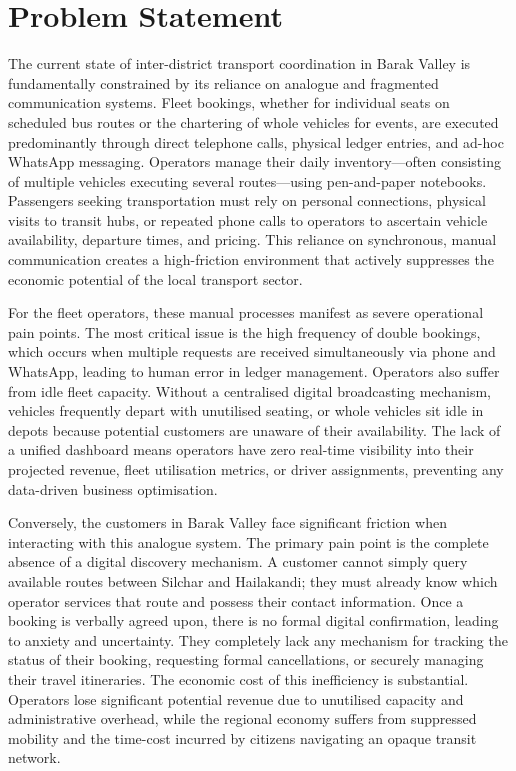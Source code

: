 \documentclass[12pt,a4paper]{report}
\begin{document}
\chapter{Problem Statement}

The current state of inter-district transport coordination in Barak Valley is fundamentally constrained by its reliance on analogue and fragmented communication systems. Fleet bookings, whether for individual seats on scheduled bus routes or the chartering of whole vehicles for events, are executed predominantly through direct telephone calls, physical ledger entries, and ad-hoc WhatsApp messaging. Operators manage their daily inventory---often consisting of multiple vehicles executing several routes---using pen-and-paper notebooks. Passengers seeking transportation must rely on personal connections, physical visits to transit hubs, or repeated phone calls to operators to ascertain vehicle availability, departure times, and pricing. This reliance on synchronous, manual communication creates a high-friction environment that actively suppresses the economic potential of the local transport sector.

For the fleet operators, these manual processes manifest as severe operational pain points. The most critical issue is the high frequency of double bookings, which occurs when multiple requests are received simultaneously via phone and WhatsApp, leading to human error in ledger management. Operators also suffer from idle fleet capacity. Without a centralised digital broadcasting mechanism, vehicles frequently depart with unutilised seating, or whole vehicles sit idle in depots because potential customers are unaware of their availability. The lack of a unified dashboard means operators have zero real-time visibility into their projected revenue, fleet utilisation metrics, or driver assignments, preventing any data-driven business optimisation.

Conversely, the customers in Barak Valley face significant friction when interacting with this analogue system. The primary pain point is the complete absence of a digital discovery mechanism. A customer cannot simply query available routes between Silchar and Hailakandi; they must already know which operator services that route and possess their contact information. Once a booking is verbally agreed upon, there is no formal digital confirmation, leading to anxiety and uncertainty. They completely lack any mechanism for tracking the status of their booking, requesting formal cancellations, or securely managing their travel itineraries. The economic cost of this inefficiency is substantial. Operators lose significant potential revenue due to unutilised capacity and administrative overhead, while the regional economy suffers from suppressed mobility and the time-cost incurred by citizens navigating an opaque transit network.
\end{document}
